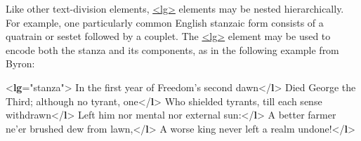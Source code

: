 Like other text-division elements, \hyperref[TEI.lg]{<lg>} elements may be nested hierarchically. For example, one particularly common English stanzaic form consists of a quatrain or sestet followed by a couplet. The \hyperref[TEI.lg]{<lg>} element may be used to encode both the stanza and its components, as in the following example from Byron: \par\bgroup{}\exampleFont \begin{shaded}\noindent\mbox{}{<\textbf{lg}\hspace*{1em}{type}="{stanza}">}\mbox{}\newline 
{}\mbox{}\newline 
\hspace*{1em}In the first year of Freedom's second dawn{</\textbf{l}>}\mbox{}\newline 
\hspace*{1em}Died George the Third; although no tyrant, one{</\textbf{l}>}\mbox{}\newline 
\hspace*{1em}Who shielded tyrants, till each sense withdrawn{</\textbf{l}>}\mbox{}\newline 
\hspace*{1em}Left him nor mental nor external sun:{</\textbf{l}>}\mbox{}\newline 
\hspace*{1em}A better farmer ne'er brushed dew from lawn,{</\textbf{l}>}\mbox{}\newline 
\hspace*{1em}A worse king never left a realm undone!{</\textbf{l}>}\mbox{}\newline 

\end{shaded}
